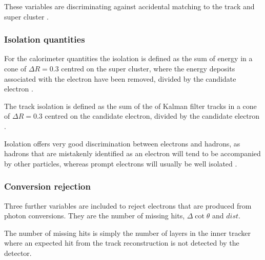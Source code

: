 These variables are discriminating against accidental matching to the track and
super cluster \cite{baffioni2009identification}.

\subsubsection{Isolation quantities}
For the calorimeter quantities the isolation is defined as the sum of energy in
a cone of $\Delta R = 0.3$ centred on the super cluster, where the energy
deposits associated with the electron have been removed, divided by the
candidate electron \Pt.

The track isolation is defined as the sum of the \Pt of Kalman filter tracks in
a cone of $\Delta R = 0.3 $ centred on the candidate electron, divided by the
candidate electron \Pt.

Isolation offers very good discrimination between electrons and hadrons, as
hadrons that are mistakenly identified as an electron will tend to be
accompanied by other particles, whereas prompt electrons will usually be well
isolated \cite{baffioni2009identification,nikos}.

\subsubsection{Conversion rejection}
Three further variables are included to reject electrons that are produced from
photon conversions. They are the number of missing hits, $\Delta\cot\theta$ and
$dist$. 

The number of missing hits is simply the number of layers in the inner
tracker where an expected hit from the track reconstruction is not detected by
the detector.

